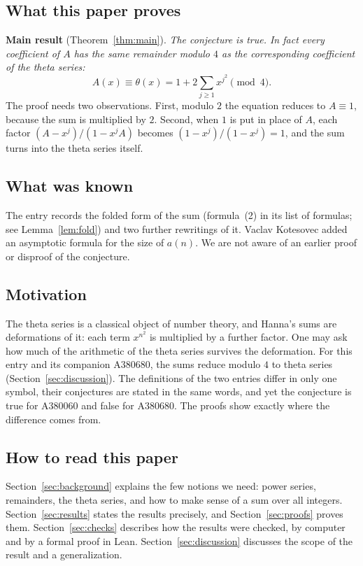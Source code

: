 \documentclass[11pt,a4paper]{article}
\theoremstyle{definition}
\theoremstyle{remark}
\begin{document}
\subsection{What this paper proves}
\textbf{Main result} (Theorem~\ref{thm:main}). \emph{The conjecture is true. In fact every coefficient of $A$
has the same remainder modulo $4$ as the corresponding coefficient of the theta series:}
\[
A(x)\equiv\theta(x)=1+2\sum_{j\ge1}x^{j^2}\pmod 4 .
\]
The proof needs two observations. First, modulo $2$ the equation reduces to $A\equiv1$, because the sum is multiplied
by $2$. Second, when $1$ is put in place of $A$, each factor $(A-x^j)/(1-x^jA)$ becomes $(1-x^j)/(1-x^j)=1$, and the sum
turns into the theta series itself.

\subsection{What was known}
The entry records the folded form of the sum (formula~(2) in its list of formulas; see Lemma~\ref{lem:fold}) and two further
rewritings of it. Vaclav Kotesovec added an asymptotic formula for the size of $a(n)$. We are not aware of an earlier proof or disproof of the conjecture.

\subsection{Motivation}
The theta series is a classical object of number theory, and Hanna's sums are deformations of it: each term
$x^{n^2}$ is multiplied by a further factor. One may ask how much of the arithmetic of the theta series survives the
deformation. For this entry and its companion A380680, the sums reduce modulo $4$ to theta series
(Section~\ref{sec:discussion}).
The definitions of the two entries differ in only one symbol, their
conjectures are stated in the same words, and yet the conjecture is true for A380060 and false for A380680. The proofs show exactly where the
difference comes from.

\subsection{How to read this paper}
Section~\ref{sec:background} explains the few notions we need: power series, remainders, the theta series, and how to
make sense of a sum over all integers. Section~\ref{sec:results} states the results precisely, and
Section~\ref{sec:proofs} proves them. Section~\ref{sec:checks} describes how the results were
checked, by computer and by a formal proof in Lean. Section~\ref{sec:discussion} discusses the scope of the result
and a generalization.
\end{document}
